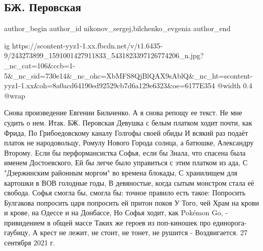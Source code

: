  
 
 
 
 
 
\subsection{БЖ. Перовская}
\label{sec:27_09_2021.fb.nikonov_sergej.1.bilchenko_perovskaja}
 
\ifcmt
 author_begin
   author_id nikonov_sergej,bilchenko_evgenia
 author_end
\fi

\ifcmt
  ig https://scontent-yyz1-1.xx.fbcdn.net/v/t1.6435-9/243273899_1591001427911833_5431823397126774206_n.jpg?_nc_cat=106&ccb=1-5&_nc_sid=730e14&_nc_ohc=XbMFS8QjBlQAX9sAblQ&_nc_ht=scontent-yyz1-1.xx&oh=8a0acd64190ed92529cb7d6a129e6323&oe=6177E354
  @width 0.4
  @wrap 
\fi

Снова произведение Евгении Бильченко. А я снова репощу ее текст. Не мне судить о нем.  Итак.
БЖ. Перовская
Девушка с белым платком ходит почти, как Фрида,
По Грибоедовскому каналу Голгофы своей обиды
И всякий раз подаёт платок не народовольцу, Ромулу
Нового Города солнца, а батюшке, Александру Второму.
Если бы перформансистка Софья, если бы
Знала, что спасена была именем Достоевского,
Ей бы легче было управиться с этим платком из ада,
С "Дзержинским районным моргом" во времена блокады,
С хранилищем для картошки в ВОВ голодные годы,
В девяностые, когда сытым монстром стала её свобода.
Софья смогла бы, смогла бы: точное правило есть такое:
Попросить Булгакова попросить царя попросить ей притон покоя
У Того, чей Храм на крови и крове, на Одессе и на Донбассе,
Но Софья ходит, как Pokémon Go, - привидением в общей массе
Таких же героев из поп-киношек про единорога-гаубицу,
А крест не лежит, не стоит, не тонет, не рушится - Воздвигается.
27 сентября 2021 г.
